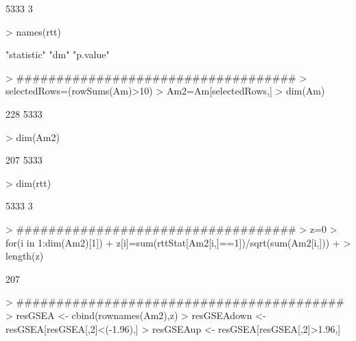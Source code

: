 \documentclass{article}
\begin{document}
\begin{Schunk}
\begin{Soutput}
[1] 5333    3
\end{Soutput}
\begin{Sinput}
> names(rtt)
\end{Sinput}
\begin{Soutput}
[1] "statistic" "dm"        "p.value"  
\end{Soutput}
\begin{Sinput}
> ###################################
> selectedRows=(rowSums(Am)>10)
> Am2=Am[selectedRows,]
> dim(Am)
\end{Sinput}
\begin{Soutput}
[1]  228 5333
\end{Soutput}
\begin{Sinput}
> dim(Am2)
\end{Sinput}
\begin{Soutput}
[1]  207 5333
\end{Soutput}
\begin{Sinput}
> dim(rtt)
\end{Sinput}
\begin{Soutput}
[1] 5333    3
\end{Soutput}
\begin{Sinput}
> ###################################
> z=0
> for(i in 1:dim(Am2)[1]){
+ z[i]=sum(rttStat[Am2[i,]==1])/sqrt(sum(Am2[i,]))
+ }
> length(z)
\end{Sinput}
\begin{Soutput}
[1] 207
\end{Soutput}
\begin{Sinput}
> #########################################
> resGSEA <- cbind(rownames(Am2),z)
> resGSEAdown <- resGSEA[resGSEA[,2]<(-1.96),]
> resGSEAup <- resGSEA[resGSEA[,2]>1.96,]
\end{Sinput}
\end{Schunk}
\end{document}
